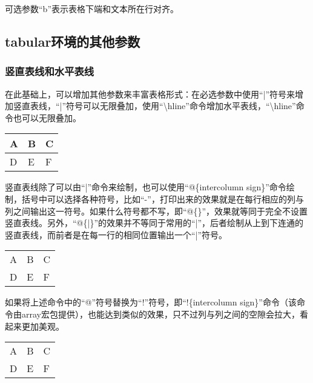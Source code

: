 ﻿\documentclass{article}
\begin{document}
    可选参数``b''表示表格下端和文本所在行对齐。

\subsection{tabular环境的其他参数}
\subsubsection{竖直表线和水平表线}
    在此基础上，可以增加其他参数来丰富表格形式：在必选参数中使用``|''符号来增加竖直表线，``|''符号可以无限叠加，使用``\textbackslash hline''命令增加水平表线，``\textbackslash hline''命令也可以无限叠加。

    \mbox{}

    \begin{tabular}{l||||||l|l}
        \hline
        A&B&C\\
        \hline
        \hline
        \hline
        \hline
        D&E&F\\
        \hline
    \end{tabular}

    \mbox{}

    竖直表线除了可以由``|''命令来绘制，也可以使用``@\{intercolumn sign\}''命令绘制，括号中可以选择各种符号，比如``-''，打印出来的效果就是在每行相应的列与列之间输出这一符号。如果什么符号都不写，即``@\{\}''，效果就等同于完全不设置竖直表线。另外，``@\{|\}''的效果并不等同于常用的``|''，后者绘制从上到下连通的竖直表线，而前者是在每一行的相同位置输出一个``|''符号。

    \mbox{}

    \begin{tabular}{l@{-}l@{|}l}
        A&B&C\\
        D&E&F\\
    \end{tabular}
    
    \mbox{}

    如果将上述命令中的``@''符号替换为``!''符号，即``!\{intercolumn sign\}''命令（该命令由array宏包提供），也能达到类似的效果，只不过列与列之间的空隙会拉大，看起来更加美观。

    \mbox{}

    \begin{tabular}{l!{-}l!{|}l}
        A&B&C\\
        D&E&F\\
    \end{tabular}
\end{document}
